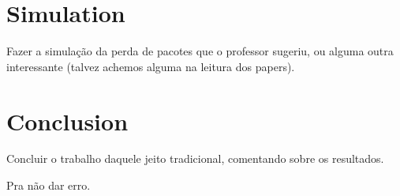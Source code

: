 \documentclass[english]{sbrt}
\begin{document}
\section{\textbf{Simulation}}
Fazer a simulação da perda de pacotes que o professor sugeriu, ou alguma outra interessante (talvez achemos alguma na leitura dos papers).

\section{\textbf{Conclusion}}
Concluir o trabalho daquele jeito tradicional, comentando sobre os resultados.

\cite{maodv01} Pra não dar erro.



\end{document}
